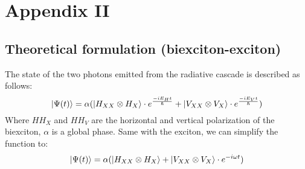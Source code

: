 \section{Appendix II} \label{appendix2}
\subsection*{Theoretical formulation (biexciton-exciton)}
The state of the two photons emitted from the radiative cascade is described as follows:
\begin{equation}
	\ket{\Psi(t)} = \alpha(\ket{H_{XX} \otimes  H_X}\cdot e^{\frac{-iE_H t}{\hslash}}+\ket{V_{XX}\otimes V_X}\cdot e^{\frac{-iE_Vt}{\hslash}})
\end{equation}
Where $HH_X$ and $HH_V$ are the horizontal and vertical polarization of the biexciton, $\alpha$ is a global phase. Same with the exciton, we can simplify the function to:
\begin{equation}
	\ket{\Psi(t)} = \alpha(\ket{H_{XX} \otimes H_X}+\ket{V_{XX}\otimes V_X}\cdot e^{-i\omega t})
\end{equation}
